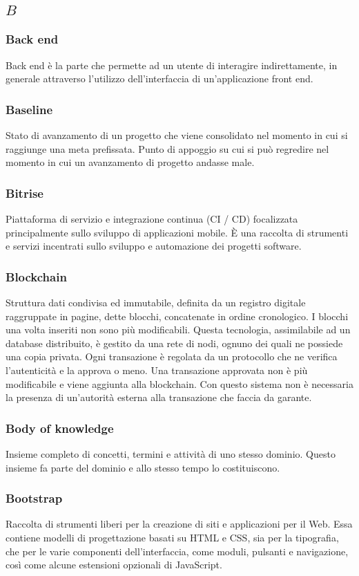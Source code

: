 \subsection*{\quad$B\quad$}
\subsubsection*{Back end}
Back end è la parte che permette ad un utente di interagire indirettamente, in generale attraverso l’utilizzo dell’interfaccia di un’applicazione front end.

\subsubsection*{Baseline}
Stato di avanzamento di un progetto che viene consolidato nel momento in cui si raggiunge una meta prefissata. Punto di appoggio su cui si può regredire nel momento in cui un avanzamento di progetto andasse male.

\subsubsection*{Bitrise}
Piattaforma di servizio e integrazione continua (CI / CD) focalizzata principalmente sullo sviluppo di applicazioni mobile. È una raccolta di strumenti e servizi incentrati sullo sviluppo e automazione dei progetti software.

\subsubsection*{Blockchain}
Struttura dati condivisa ed immutabile, definita da un registro digitale raggruppate in pagine, dette blocchi, concatenate in ordine cronologico. I blocchi una volta inseriti non sono più modificabili. Questa tecnologia, assimilabile ad un database distribuito, è gestito da una rete di nodi, ognuno dei quali ne possiede una copia privata. Ogni transazione è regolata da un protocollo che
ne verifica l’autenticità e la approva o meno. Una transazione approvata non è più modificabile e viene aggiunta alla blockchain. Con questo sistema non è necessaria la presenza di un’autorità esterna alla transazione che faccia da garante.

\subsubsection*{Body of knowledge}
Insieme completo di concetti, termini e attività di uno stesso dominio. Questo insieme fa parte del dominio e allo stesso tempo lo costituiscono.

\subsubsection*{Bootstrap}
Raccolta di strumenti liberi per la creazione di siti e applicazioni per il Web. Essa contiene modelli di progettazione basati su HTML e CSS, sia per la tipografia, che per le varie componenti dell'interfaccia, come moduli, pulsanti e navigazione, così come alcune estensioni opzionali di JavaScript.
